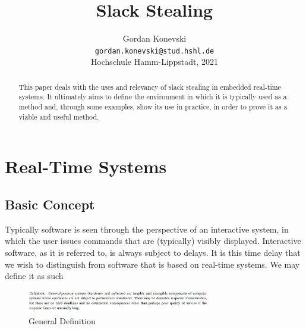 \documentclass[conference]{IEEEtran}
\author{%
	Gordan Konevski \\
	\texttt{gordan.konevski@stud.hshl.de} \\
	Hochschule Hamm-Lippstadt, 2021
}
\begin{document}
\title{Slack Stealing}
\maketitle

\begin{abstract}
This paper deals with the uses and relevancy of slack stealing in embedded real-time systems. It ultimately aims to define the environment in which it is typically used as a method and, through  some examples, show its use in practice, in order to prove it as a viable and useful method.
\end{abstract}

\section {Real-Time Systems}
\subsection{Basic Concept}
Typically software is seen through the perspective of an interactive system, in which the user issues commands that are (typically) visibly displayed.  Interactive software, as it is referred to, is
always subject to delays. It is this time delay that we wish to distinguish from software that is based on real-time systems. We may define it as such 

\begin{figure}[h!]
	\includegraphics[width=8cm, height=1cm]{def1}
	\caption{General Definition}
	\centering
\end{figure}
\end{document}
